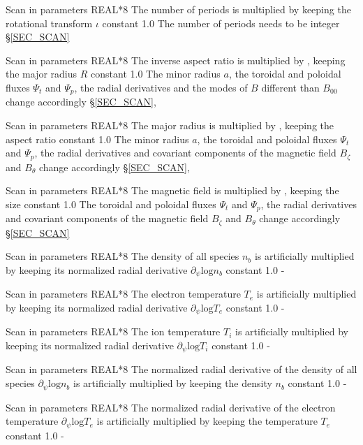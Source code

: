 {Scan in parameters}
{REAL*8}
{The number of periods is multiplied by  keeping the rotational transform $\iota$ constant}
{1.0}
{The number of periods needs to be integer}
{\S\ref{SEC_SCAN}}


{Scan in parameters}
{REAL*8}
{The inverse aspect ratio is multiplied by , keeping the major radius $R$ constant}
{1.0}
{The minor radius $a$, the toroidal and poloidal fluxes $\Psi_t$ and $\Psi_p$, the radial derivatives and the modes of $B$ different than $B_{00}$ change accordingly}
{\S\ref{SEC_SCAN}, \citep{calvo2018jpp}}


{Scan in parameters}
{REAL*8}
{The major radius is multiplied by , keeping the aspect ratio constant}
{1.0}
{The minor radius $a$, the toroidal and poloidal fluxes $\Psi_t$ and $\Psi_p$, the radial derivatives and covariant components of the magnetic field $B_\zeta$ and $B_\theta$ change accordingly}
{\S\ref{SEC_SCAN}, \citep{calvo2018jpp}}


{Scan in parameters}
{REAL*8}
{The magnetic field is multiplied by , keeping the size constant}
{1.0}
{The toroidal and poloidal fluxes $\Psi_t$ and $\Psi_p$, the radial derivatives and covariant components of the magnetic field $B_\zeta$ and $B_\theta$ change accordingly}
{\S\ref{SEC_SCAN}}

{Scan in parameters}
{REAL*8}
{The density of all species $n_b$ is artificially multiplied by  keeping its normalized radial derivative $\partial_\psi\mathrm{log}n_b$ constant}
{1.0}
{-}
{}

{Scan in parameters}
{REAL*8}
{The electron temperature $T_e$ is artificially multiplied by  keeping its normalized radial derivative $\partial_\psi\mathrm{log}T_e$ constant}
{1.0}
{-}
{}

{Scan in parameters}
{REAL*8}
{The ion temperature $T_i$ is artificially multiplied by  keeping its normalized radial derivative $\partial_\psi\mathrm{log}T_i$ constant}
{1.0}
{-}
{}

{Scan in parameters}
{REAL*8}
{The normalized radial derivative of the density of all species $\partial_\psi\mathrm{log}n_b$ is artificially multiplied by  keeping the density $n_b$ constant}
{1.0}
{-}
{}

{Scan in parameters}
{REAL*8}
{The normalized radial derivative of the electron temperature $\partial_\psi\mathrm{log}T_e$ is artificially multiplied by  keeping the temperature $T_e$ constant}
{1.0}
{-}
{}

